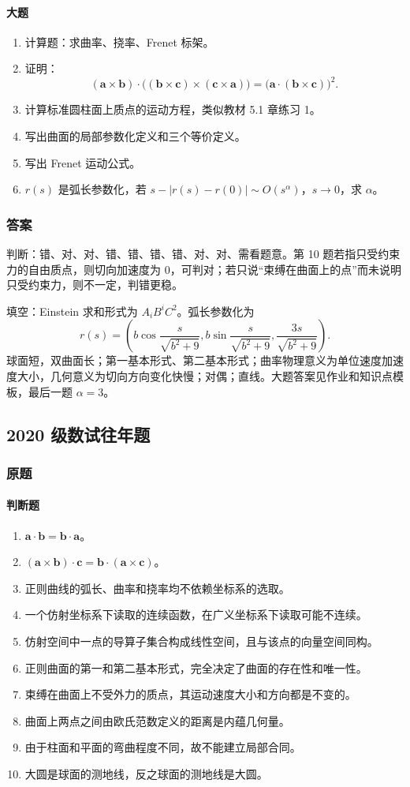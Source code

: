 \documentclass[UTF8,12pt,a4paper]{ctexart}
\newcommand{\vct}[1]{\boldsymbol{#1}}
\begin{document}
\paragraph{大题}
\begin{enumerate}
\item 计算题：求曲率、挠率、Frenet 标架。
\item 证明：
\[
(\vct a\times\vct b)\cdot\bigl((\vct b\times\vct c)\times(\vct c\times\vct a)\bigr)
=\bigl(\vct a\cdot(\vct b\times\vct c)\bigr)^2.
\]
\item 计算标准圆柱面上质点的运动方程，类似教材 5.1 章练习 1。
\item 写出曲面的局部参数化定义和三个等价定义。
\item 写出 Frenet 运动公式。
\item $r(s)$ 是弧长参数化，若 $s-|r(s)-r(0)|\sim O(s^\alpha)$，$s\to0$，求 $\alpha$。
\end{enumerate}
\subsubsection*{答案}
判断：错、对、对、错、错、错、错、对、对、需看题意。第 10 题若指只受约束力的自由质点，则切向加速度为 $0$，可判对；若只说“束缚在曲面上的点”而未说明只受约束力，则不一定，判错更稳。

填空：Einstein 求和形式为 $A_iB^iC^2$。弧长参数化为
\[
r(s)=\left(b\cos\frac{s}{\sqrt{b^2+9}},b\sin\frac{s}{\sqrt{b^2+9}},\frac{3s}{\sqrt{b^2+9}}\right).
\]
球面短，双曲面长；第一基本形式、第二基本形式；曲率物理意义为单位速度加速度大小，几何意义为切向方向变化快慢；对偶；直线。大题答案见作业和知识点模板，最后一题 $\alpha=3$。

\subsection{2020 级数试往年题}
\subsubsection*{原题}
\paragraph{判断题}
\begin{enumerate}
\item $\vct a\cdot\vct b=\vct b\cdot\vct a$。
\item $(\vct a\times\vct b)\cdot\vct c=\vct b\cdot(\vct a\times\vct c)$。
\item 正则曲线的弧长、曲率和挠率均不依赖坐标系的选取。
\item 一个仿射坐标系下读取的连续函数，在广义坐标系下读取可能不连续。
\item 仿射空间中一点的导算子集合构成线性空间，且与该点的向量空间同构。
\item 正则曲面的第一和第二基本形式，完全决定了曲面的存在性和唯一性。
\item 束缚在曲面上不受外力的质点，其运动速度大小和方向都是不变的。
\item 曲面上两点之间由欧氏范数定义的距离是内蕴几何量。
\item 由于柱面和平面的弯曲程度不同，故不能建立局部合同。
\item 大圆是球面的测地线，反之球面的测地线是大圆。
\end{enumerate}
\end{document}
